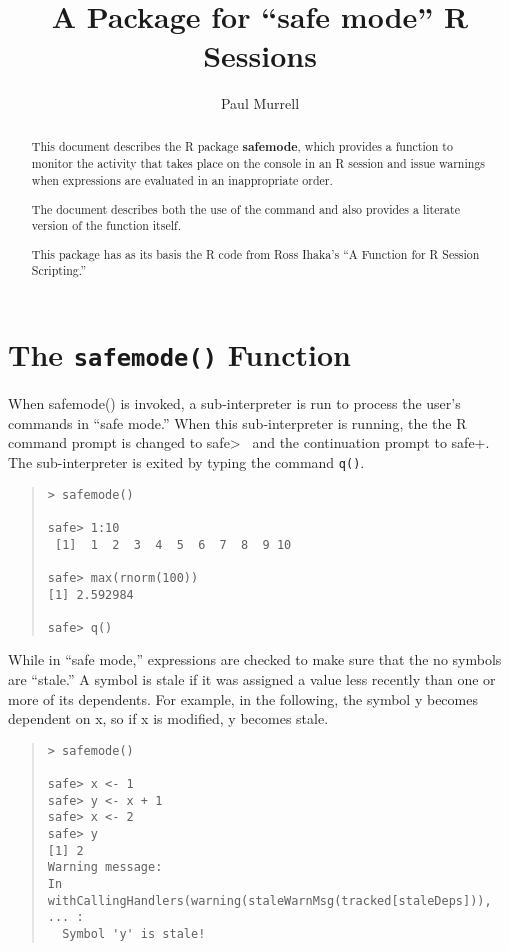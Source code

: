 \documentclass[a4paper]{article}%
\newcommand{\pkg}[1]{{\bf #1}}
\begin{document}
\title{\textbf{A Package for ``safe mode'' R Sessions}}
\author{Paul Murrell}
\date{}
\maketitle
\begin{abstract}
 
  This document describes the R package \pkg{safemode},
  which provides a function to 
  monitor the activity that takes place on the
  console in an R session and issue warnings when expressions
  are evaluated in an inappropriate order.
  
  The document describes both the use of the command and also provides
  a literate version of the function itself.
  
  This package has as its basis the R code from Ross Ihaka's 
  ``A Function for R Session Scripting.''
\end{abstract}

\section{The \texttt{safemode()} Function}

When {\Tt{}safemode()\nwendquote} is invoked, a sub-interpreter is run to process the
user's commands in ``safe mode.''  
When this sub-interpreter is running, the the R
command prompt is changed to {\Tt{}safe>\ \nwendquote} and the continuation
prompt to {\Tt{}safe+\nwendquote}.  The sub-interpreter is exited by
typing the command \verb|q()|.
\begin{quote}
  \begin{verbatim}
> safemode()

safe> 1:10
 [1]  1  2  3  4  5  6  7  8  9 10
 
safe> max(rnorm(100))
[1] 2.592984

safe> q()
\end{verbatim}
\end{quote}
While in ``safe mode,'' expressions are checked to make sure
that the no symbols are ``stale.''  A symbol is stale if
it was assigned a value less recently than one or more of its
dependents.  For example, in the following, the symbol {\Tt{}y\nwendquote}
becomes dependent on {\Tt{}x\nwendquote}, so if {\Tt{}x\nwendquote} is modified, {\Tt{}y\nwendquote} 
becomes stale.

\begin{quote}
  \begin{verbatim}
> safemode()

safe> x <- 1
safe> y <- x + 1
safe> x <- 2
safe> y
[1] 2
Warning message:
In withCallingHandlers(warning(staleWarnMsg(tracked[staleDeps])),  ... :
  Symbol 'y' is stale!
\end{verbatim}
\end{quote}
\end{document}

